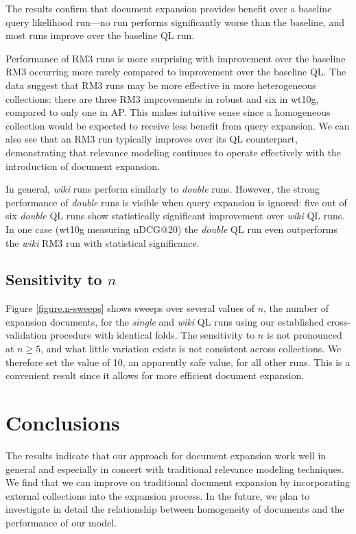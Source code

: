 \documentclass{sig-alternate}
\begin{document}
The results confirm that document expansion provides benefit over a baseline query likelihood run---no run performs significantly worse than the baseline, and most runs improve over the baseline QL run. %

Performance of RM3 runs is more surprising with improvement over the baseline RM3 occurring more rarely compared to improvement over the baseline QL. The data suggest that RM3 runs may be more effective in more heterogeneous collections: there are three RM3 improvements in robust and six in wt10g, compared to only one in AP. This makes intuitive sense since a homogeneous collection would be expected to receive less benefit from query expansion. We can also see that an RM3 run typically improves over its QL counterpart, demonstrating that relevance modeling continues to operate effectively with the introduction of document expansion.

In general, \textit{wiki} runs perform similarly to \textit{double} runs. However, the strong performance of \textit{double} runs is visible when query expansion is ignored: five out of six \textit{double} QL runs show statistically significant improvement over \textit{wiki} QL runs. In one case (wt10g measuring nDCG@20) the \textit{double} QL run even outperforms the \textit{wiki} RM3 run with statistical significance.

\subsection{Sensitivity to \boldmath$n$}\label{section.n-sensitivity}

Figure \ref{figure.n-sweeps} shows sweeps over several values of $n$, the number of expansion documents, for the \textit{single} and \textit{wiki} QL runs using our established cross-validation procedure with identical folds. The sensitivity to $n$ is not pronounced at $n \geq 5$, and what little variation exists is not consistent across collections. We therefore set the value of 10, an apparently safe value, for all other runs. This is a convenient result since it allows for more efficient document expansion.

\section{Conclusions}\label{section.conclusions}

The results indicate that our approach for document expansion work well in general and especially in concert with traditional relevance modeling techniques. We find that we can improve on traditional document expansion by incorporating external collections into the expansion process. In the future, we plan to investigate in detail the relationship between homogeneity of documents and the performance of our model.
\end{document}
